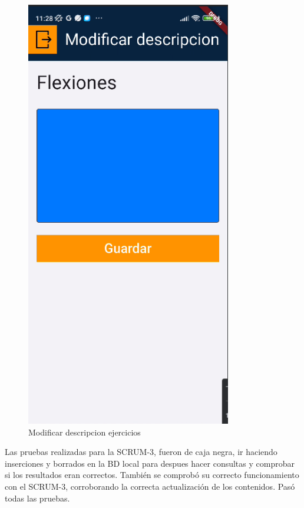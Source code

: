 \begin{figure}[H]
   \centering
    \includegraphics[width=0.8\textwidth]{pantallas/ModDescpEjer.png}
    \caption{Modificar descripcion ejercicios}
    \label{fig:ModDescpEjer}
\end{figure}

Las pruebas realizadas para la SCRUM-3, fueron de caja negra, ir haciendo inserciones y borrados en la BD local para despues hacer consultas y comprobar si los resultados eran correctos. También se comprobó su correcto funcionamiento con el SCRUM-3, corroborando la correcta actualización de los contenidos. Pasó todas las pruebas.

